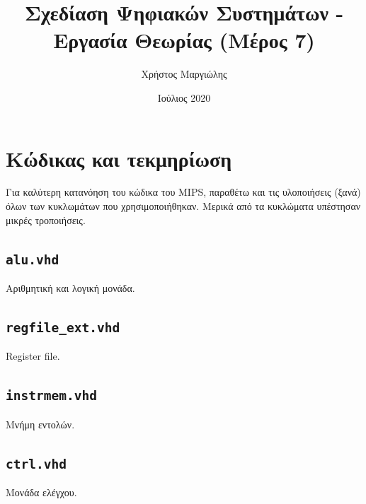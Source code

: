 \documentclass{article}
\title{Σχεδίαση Ψηφιακών Συστημάτων - Εργασία Θεωρίας (Μέρος 7)}
\author{Χρήστος Μαργιώλης}
\date{Ιούλιος 2020}
\begin{document}
\begin{titlepage}
        \maketitle
\end{titlepage}

\renewcommand{\contentsname}{Περιεχόμενα}
\tableofcontents

\section{Κώδικας και τεκμηρίωση}

Για καλύτερη κατανόηση του κώδικα του MIPS, παραθέτω και τις υλοποιήσεις (ξανά)
όλων των κυκλωμάτων που χρησιμοποιήθηκαν. Μερικά από τα κυκλώματα υπέστησαν μικρές 
τροποιήσεις.

\subsection{\lstinline{alu.vhd}}

Αριθμητική και λογική μονάδα. \\


\pagebreak

\subsection{\lstinline{regfile_ext.vhd}}

Register file. \\


\pagebreak

\subsection{\lstinline{instrmem.vhd}}

Μνήμη εντολών. \\


\pagebreak

\subsection{\lstinline{ctrl.vhd}}

Μονάδα ελέγχου. \\


\pagebreak
\end{document}
